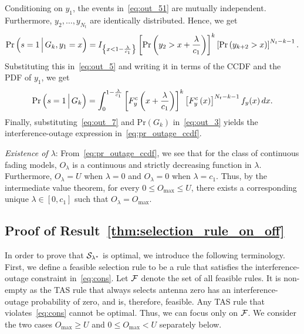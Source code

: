 \documentclass[12pt,draftcls,peerreview,onecolumn]{IEEEtran}
\newcommand{\brac}[1]{\left({#1}\right)}
\newcommand{\cbrac}[1]{\left\{{#1}\right\}}
\newcommand{\indic}[1]{I_{\cbrac{#1}}}
\newcommand{\prob}[1]{\text{Pr}\brac{#1}}
\newcommand{\given}{\arrowvert}
\newcommand{\Given}{\Big\arrowvert}
\newcommand{\setG}{G}
\newcommand{\setGk}{\setG_k}
\newcommand{\lam}{\lambda}
\newcommand{\F}{\cal{F}}
\newcommand{\Nt}{{N_t}}
\newcommand{\outmax}{O_{\text{max}}}
\newcommand{\cone}{c_{1}}
\newcommand{\out}{O}
\newcommand{\lambym}{\frac{\lam}{\cone}}
\newcommand{\yk}[1]{y_{#1}}
\newcommand{\un}{U}
\newcommand{\outlam}{\out_{\lam}}
\newcommand{\callamstarrule}{\cal S_{\lam^{*}}}
\begin{document}
Conditioning on $\yk{1}$, the events in~\eqref{eq:out_51} are mutually independent. Furthermore, $\yk{2},\ldots,\yk{\Nt} $ are identically distributed. Hence, we get
%
\begin{equation}
\text{Pr}\brac{s=1\Given \setGk, \yk{1}=x} = \indic{x<1-\lambym}\left[\text{Pr}\brac{\yk{2}>x+\lambym}\right]^{k} \left[\text{Pr}\brac{\yk{k+2}>x}\right]^{\Nt-k-1}.
\label{eq:out_6}
\end{equation}
%
Substituting this in~\eqref{eq:out_5} and writing it in terms of the CCDF and the PDF of $\yk{1}$, we get 
\begin{equation}
\text{Pr}\brac{s=1\Given\setGk} =\int_{0}^{1-\lambym}\left[F_{y}^{c}\left(x+\lambym\right)\right]^k \left[F_{y}^{c}\left(x\right)\right]^{\Nt-k-1}f_{y}(x)\,dx.
\label{eq:out_7}
\end{equation}
Finally, substituting~\eqref{eq:out_7} and $\prob{\setGk}$ in~\eqref{eq:out_3} yields the interference-outage expression in~\eqref{eq:pr_outage_ccdf}. 

{\em Existence of $\lam$}: From~\eqref{eq:pr_outage_ccdf}, we see that for the class of continuous fading models, $\outlam$ is a continuous and strictly decreasing  function in $\lam$. %
Furthermore, $\outlam=\un$ when $\lam=0$ and $\outlam=0$ when $\lam=\cone$. Thus, by the intermediate value theorem, for every $0\leq\outmax\leq\un$,  there exists a corresponding unique $\lam\in[0,\cone]$ such that $\outlam=\outmax$. 
  

		

\subsection{Proof of Result~\ref{thm:selection_rule_on_off}}
\label{proof:selection_rule_on_off}
In order to prove that $\callamstarrule$ is optimal, we introduce the following terminology. First, we define a feasible selection rule to be a rule that satisfies the interference-outage constraint in~\eqref{eq:cons}. Let $\F$ denote the set of all feasible rules. It is non-empty as the TAS rule that always selects antenna zero has an interference-outage probability of zero, and is, therefore, feasible. Any TAS rule that violates~\eqref{eq:cons} cannot be optimal. Thus, we can focus only on $\F$. We consider the two cases $\outmax\geq\un$ and $0\leq\outmax<\un$ separately below.
\end{document}
